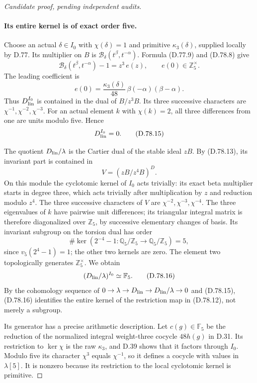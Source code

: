 \begin{proof}[Candidate proof, pending independent audits]
\paragraph{Its entire kernel is of exact order five.}
Choose an actual \(\delta\in I_0\) with \(\chi(\delta)=1\)
and primitive \(\kappa_3(\delta)\), supplied locally by D.77.
Its multiplier on \(B\) is \(\mathcal B_\delta(t^\beta,t^{-\alpha})\).
Formula (D.77.9) and (D.78.8) give
\[
 \mathcal B_\delta(t^\beta,t^{-\alpha})-1
      =z^3\,e(z),\qquad e(0)\in\mathbb Z_5^\times .
                                                               \tag{D.78.13}
\]
The leading coefficient is
\[
 e(0)=\frac{\kappa_3(\delta)}{48}\,
                     \beta(-\alpha)(\beta-\alpha).
                                                               \tag{D.78.14}
\]
Thus \(D_{\rm lin}^{I_0}\) is contained in the dual of
\(B/z^3B\). Its three successive characters are
\(\chi^{-1},\chi^{-2},\chi^{-3}\). For an actual element
\(k\) with \(\chi(k)=2\), all three differences from one
are units modulo five. Hence
\[
                         D_{\rm lin}^{I_0}=0.           \tag{D.78.15}
\]

The quotient \(D_{\rm lin}/\lambda\) is the Cartier dual
of the stable ideal \(zB\). By (D.78.13), its invariant
part is contained in
\[
                       V=(zB/z^4B)^D.
 \]
On this module the cyclotomic kernel of \(I_0\) acts
trivially: its exact beta multiplier starts in degree
three, which acts trivially after multiplication by \(z\)
and reduction modulo \(z^4\). The three successive
characters of \(V\) are
\(\chi^{-2},\chi^{-3},\chi^{-4}\).
The three eigenvalues of \(k\) have pairwise unit
differences; its triangular integral matrix is therefore
diagonalized over \(\mathbb Z_5\), by successive elementary
changes of basis. Its invariant subgroup on the torsion
dual has order
\[
       \#\ker(2^{-4}-1:\mathbb Q_5/\mathbb Z_5
                         \to\mathbb Q_5/\mathbb Z_5)=5,
 \]
since \(v_5(2^4-1)=1\); the other two kernels are zero.
The element two topologically generates \(\mathbb Z_5^\times\).
We obtain
\[
                (D_{\rm lin}/\lambda)^{I_0}\simeq\mathbb F_5.
                                                               \tag{D.78.16}
\]
By the cohomology sequence of
\(0\to\lambda\to D_{\rm lin}\to D_{\rm lin}/\lambda\to0\)
and (D.78.15), (D.78.16) identifies the entire kernel of
the restriction map in (D.78.12), not merely a subgroup.

Its generator has a precise arithmetic description.
Let \(c(g)\in\mathbb F_5\) be the reduction of the normalized
integral weight-three cocycle \(48h(g)\) in D.31.
Its restriction to \(\ker\chi\) is the raw \(\kappa_3\),
and D.39 shows that it factors through \(I_0\).
Modulo five its character \(\chi^3\) equals \(\chi^{-1}\),
so it defines a cocycle with values in \(\lambda[5]\).
It is nonzero because its restriction to the local
cyclotomic kernel is primitive.


\end{proof}
